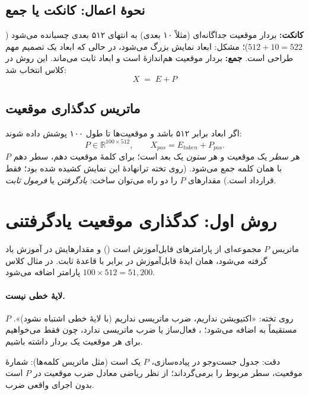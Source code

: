 \subsection{نحوهٔ اعمال: کانکت یا جمع}
\textbf{کانکت:} بردار موقعیت جداگانه‌ای (مثلاً ۱۰ بعدی) به انتهای  ۵۱۲ بعدی چسبانده می‌شود ($512+10=522$)؛ مشکل: ابعاد نمایش بزرگ می‌شود، در حالی که ابعاد  یک تصمیم مهم طراحی است. \textbf{جمع:} بردار موقعیت هم‌اندازهٔ  است و ابعاد ثابت می‌ماند. این روش در کلاس انتخاب شد:
\[
\boxed{X \;=\; E + P}
\]

\subsection{ماتریس کدگذاری موقعیت}
اگر ابعاد  برابر ۵۱۲ باشد و موقعیت‌ها تا طول ۱۰۰ پوشش داده شوند:
\[
\boxed{P\in\mathbb{R}^{100\times 512}},\qquad X_{pos} = E_{token} + P_{pos}.
\]
هر \emph{سطر} یک موقعیت و هر \emph{ستون} یک بعد است؛ برای کلمهٔ موقعیت دهم، سطر دهم $P$ با  همان کلمه جمع می‌شود. (روی تخته ترانهادهٔ این نمایش کشیده شده بود؛ فقط قرارداد است.) مقدارهای $P$ را دو راه می‌توان ساخت: \emph{یادگرفتن} یا \emph{فرمول ثابت}.

\section{روش اول: کدگذاری موقعیت یادگرفتنی}
ماتریس $P$ مجموعه‌ای از پارامترهای قابل‌آموزش است () و مقدارهایش در آموزش یاد گرفته می‌شود، همان ایدهٔ  قابل‌آموزش در برابر  با قاعدهٔ ثابت. در مثال کلاس $100\times512=51{,}200$ پارامتر اضافه می‌شود.

\paragraph{لایهٔ خطی نیست.} روی تخته: «اکتیویشن نداریم، ضرب ماتریسی نداریم (با لایهٔ خطی اشتباه نشود)». $P$ مستقیماً به  اضافه می‌شود؛ ، فعال‌ساز یا ضرب ماتریسی ندارد، چون فقط می‌خواهیم برای هر موقعیت یک بردار داشته باشیم.

\begin{correctionbox}{دقت: جدول جست‌وجو}
در پیاده‌سازی، $P$ یک  است (مثل ماتریس  کلمه‌ها): شمارهٔ موقعیت، سطر مربوط را برمی‌گرداند؛ از نظر ریاضی معادل ضرب  موقعیت در $P$ است بدون اجرای واقعی ضرب.
\end{correctionbox}

